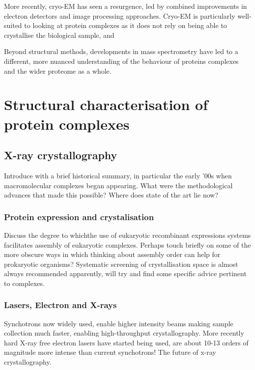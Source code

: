 \documentclass[a4paper,11pt,twoside,openright]{scrbook}
\begin{document}
More recently, cryo-EM has seen a resurgence, led by combined improvements in electron detectors and image processing approaches. Cryo-EM is particularly well-suited to looking at protein complexes as it does not rely on being able to crystallise the biological sample, and

Beyond structural methods, developments in mass spectrometry have led to a different, more nuanced understanding of the behaviour of proteins complexes and the wider proteome as a whole.

%


\section{Structural characterisation of protein complexes}

\subsection{X-ray crystallography}
Introduce with a brief historical summary, in particular the early '00s when macromolecular complexes began appearing. What were the methodological advances that made this possible? Where does state of the art lie now?
\subsubsection{Protein expression and crystalisation}
Discuss the degree to whichthe use of eukaryotic recombinant expressions systems facilitates assembly of eukaryotic complexes. Perhaps touch briefly on some of the more obscure ways in which thinking about assembly order can help for prokaryotic organisms? Systematic screening of crystallisation space is almost always recommended apparently, will try and find some specific advice pertinent to complexes.
\subsubsection{Lasers, Electron and X-rays}
Synchotrons now widely used, enable higher intensity beams making sample collection much faster, enabling high-throughput crystallography. More recently hard X-ray free electron lasers have started being used, are about 10-13 orders of magnitude more intense than current synchotrons! The future of x-ray crystallography.
\end{document}
